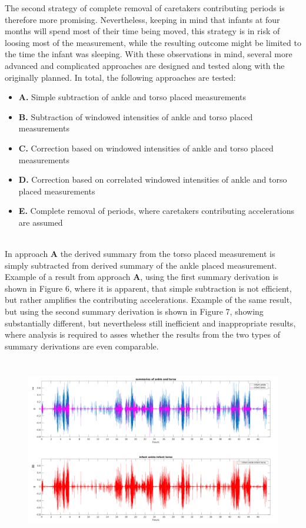 \documentclass{article}
\begin{document}
{The second strategy of complete removal of caretakers contributing periods is therefore more promising. Nevertheless, keeping in mind that infants at four months will spend most of their time being moved, this strategy is in risk of loosing most of the measurement, while the resulting outcome might be limited to the time the infant was sleeping. With these observations in mind, several more advanced and complicated approaches are designed and tested along with the originally planned. In total, the following approaches are tested:
\begin{itemize}
\item \textbf{A.} Simple subtraction of ankle and torso placed measurements
\item \textbf{B.} Subtraction of windowed intensities of ankle and torso placed measurements
\item \textbf{C.} Correction based on windowed intensities of ankle and torso placed measurements
\item \textbf{D.} Correction based on correlated windowed intensities of ankle and torso placed measurements
\item \textbf{E.} Complete removal of periods, where caretakers contributing accelerations are assumed
\end{itemize}
\\In approach \textbf{A} the derived summary from the torso placed measurement is simply subtracted from derived summary of the ankle placed measurement. Example of a result from approach \textbf{A}, using the first summary derivation is shown in Figure 6, where it is apparent, that simple subtraction is not efficient, but rather amplifies the contributing accelerations.
Example of the same result, but using the second summary derivation is shown in  Figure 7, showing substantially different, but nevertheless still inefficient and inappropriate results, where analysis is required to asses whether the results from the two types of summary derivations are even comparable.
\begin{figure}[h!]
\includegraphics[width=15cm, height=8cm]{SimpleSubtracting.png}

\end{figure}}
\end{document}
